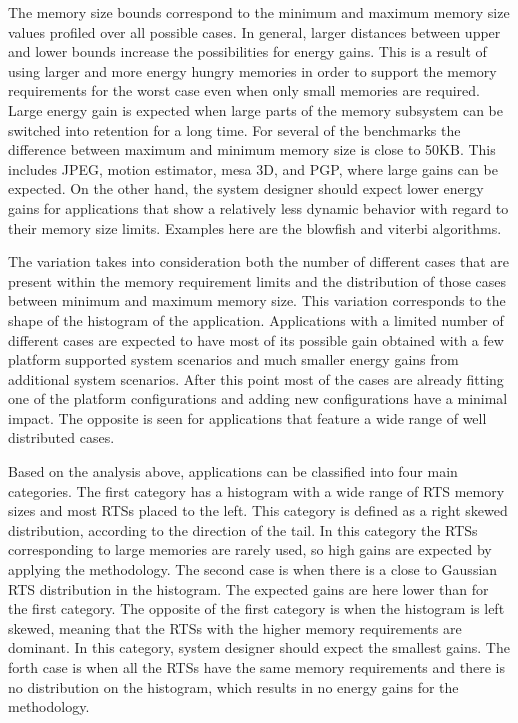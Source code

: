 The memory size bounds correspond to the minimum and maximum memory size values profiled over all possible cases. 
In general, larger distances between upper and lower bounds increase the possibilities for energy gains. 
This is a result of using larger and more energy hungry memories in order to support the memory requirements for the worst case even when only small memories are required. 
Large energy gain is expected when large parts of the memory subsystem can be switched into retention for a long time. 
For several of the benchmarks the difference between maximum and minimum memory size is close to 50KB. 
This includes JPEG, motion estimator, mesa 3D, and PGP, where large gains can be expected. 
On the other hand, the system designer should expect lower energy gains for applications that show a relatively less dynamic behavior with regard to their memory size limits. 
Examples here are the blowfish and viterbi algorithms. 

The variation takes into consideration both the number of different cases that are present within the memory requirement limits and the distribution of those cases between minimum and maximum memory size. 
This variation corresponds to the shape of the histogram of the application.
Applications with a limited number of different cases are expected to have most of its possible gain obtained with a few platform supported system scenarios and much smaller energy gains from additional system scenarios. 
After this point most of the cases are already fitting one of the platform configurations and adding new configurations have a minimal impact. 
The opposite is seen for applications that feature a wide range of well distributed cases.

Based on the analysis above, applications can be classified into four main categories. 
The first category has a histogram with a wide range of RTS memory sizes and most RTSs placed to the left. This category is defined as a right skewed distribution, according to the direction of the tail.
In this category the RTSs corresponding to large memories are rarely used, so high gains are expected by applying the methodology.
The second case is when there is a close to Gaussian RTS distribution in the histogram. The expected gains are here lower than for the first category.
The opposite of the first category is when the histogram is left skewed, meaning that the RTSs with the higher memory requirements are dominant.
In this category, system designer should expect the smallest gains.
The forth case is when all the RTSs have the same memory requirements and there is no distribution on the histogram, which results in no energy gains for the methodology.

